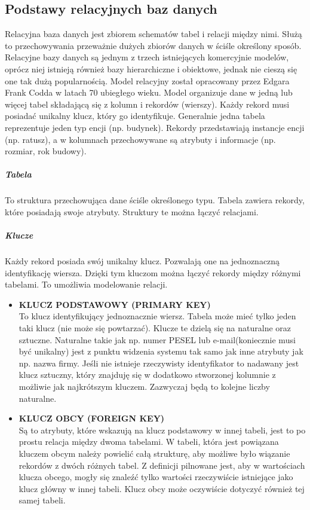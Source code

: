 \documentclass[polish, 11pt]{article}
\begin{document}
    \subsection{Podstawy relacyjnych baz danych}
    Relacyjna baza danych jest zbiorem schematów tabel i relacji między nimi. Służą to przechowywania przeważnie dużych 
    zbiorów danych w ściśle określony sposób.
    Relacyjne bazy danych są jednym z trzech istniejących komercyjnie modelów, oprócz niej istnieją również bazy hierarchiczne
    i obiektowe, jednak nie cieszą się one tak dużą popularnością. Model relacyjny został opracowany przez Edgara Frank Codda
    w latach 70 ubiegłego wieku.
    Model organizuje dane w jedną lub więcej tabel składającą się z kolumn i rekordów (wierszy). Każdy rekord musi posiadać
    unikalny klucz, który go identyfikuje. Generalnie jedna tabela reprezentuje jeden typ encji (np. budynek).
    Rekordy przedstawiają instancje encji (np. ratusz), a w kolumnach przechowywane są atrybuty i informacje (np. rozmiar, rok budowy).
    	\subparagraph{Tabela\\}
    	To struktura przechowująca dane ściśle określonego typu. Tabela zawiera rekordy, które posiadają swoje atrybuty.
    	Struktury te można łączyć relacjami.
	  	\subparagraph{Klucze\\}
  		Każdy rekord posiada swój unikalny klucz. Pozwalają one na jednoznaczną identyfikację wiersza.
  	 Dzięki tym kluczom można łączyć rekordy między różnymi tabelami. To umożliwia modelowanie relacji. 
  		\begin{itemize}
  	 	\item \textbf{KLUCZ PODSTAWOWY (PRIMARY KEY)}\\
  	 	 To klucz identyfikujący jednoznacznie wiersz. Tabela może mieć tylko jeden taki klucz (nie może się powtarzać).
  	 	 Klucze te dzielą się na naturalne oraz sztuczne. Naturalne takie jak np. numer PESEL lub e-mail(koniecznie musi być unikalny) 
  	 	 jest z punktu widzenia systemu tak samo jak inne atrybuty jak np. nazwa firmy. Jeśli nie istnieje rzeczywisty identyfikator 
  	 	 to nadawany jest klucz sztuczny, który znajduję się w dodatkowo stworzonej kolumnie z możliwie jak najkrótszym kluczem.
  	 	 Zazwyczaj będą to kolejne liczby naturalne. 
  	 	 \item \textbf{KLUCZ OBCY (FOREIGN KEY)}\\
  	 	 Są to atrybuty, które wskazują na klucz podstawowy w innej tabeli, jest to po prostu relacja między dwoma tabelami.
  	 	 W tabeli, która jest powiązana kluczem obcym należy powielić całą strukturę, aby możliwe było wiązanie rekordów z
  	 	 dwóch różnych tabel. Z definicji pilnowane jest, aby w wartościach klucza obcego, mogły się znaleźć tylko wartości
  	 	 rzeczywiście istniejące jako klucz główny w innej tabeli. Klucz obcy może oczywiście dotyczyć również tej samej tabeli.
  	 	\end{itemize}
  	 	
\end{document}
